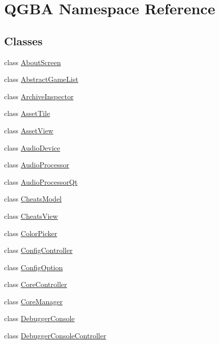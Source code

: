 \hypertarget{namespace_q_g_b_a}{}\section{Q\+G\+BA Namespace Reference}
\label{namespace_q_g_b_a}
\subsection*{Classes}
\begin{DoxyCompactItemize}
\item 
class \mbox{\hyperlink{class_q_g_b_a_1_1_about_screen}{About\+Screen}}
\item 
class \mbox{\hyperlink{class_q_g_b_a_1_1_abstract_game_list}{Abstract\+Game\+List}}
\item 
class \mbox{\hyperlink{class_q_g_b_a_1_1_archive_inspector}{Archive\+Inspector}}
\item 
class \mbox{\hyperlink{class_q_g_b_a_1_1_asset_tile}{Asset\+Tile}}
\item 
class \mbox{\hyperlink{class_q_g_b_a_1_1_asset_view}{Asset\+View}}
\item 
class \mbox{\hyperlink{class_q_g_b_a_1_1_audio_device}{Audio\+Device}}
\item 
class \mbox{\hyperlink{class_q_g_b_a_1_1_audio_processor}{Audio\+Processor}}
\item 
class \mbox{\hyperlink{class_q_g_b_a_1_1_audio_processor_qt}{Audio\+Processor\+Qt}}
\item 
class \mbox{\hyperlink{class_q_g_b_a_1_1_cheats_model}{Cheats\+Model}}
\item 
class \mbox{\hyperlink{class_q_g_b_a_1_1_cheats_view}{Cheats\+View}}
\item 
class \mbox{\hyperlink{class_q_g_b_a_1_1_color_picker}{Color\+Picker}}
\item 
class \mbox{\hyperlink{class_q_g_b_a_1_1_config_controller}{Config\+Controller}}
\item 
class \mbox{\hyperlink{class_q_g_b_a_1_1_config_option}{Config\+Option}}
\item 
class \mbox{\hyperlink{class_q_g_b_a_1_1_core_controller}{Core\+Controller}}
\item 
class \mbox{\hyperlink{class_q_g_b_a_1_1_core_manager}{Core\+Manager}}
\item 
class \mbox{\hyperlink{class_q_g_b_a_1_1_debugger_console}{Debugger\+Console}}
\item 
class \mbox{\hyperlink{class_q_g_b_a_1_1_debugger_console_controller}{Debugger\+Console\+Controller}}

\end{DoxyCompactItemize}
